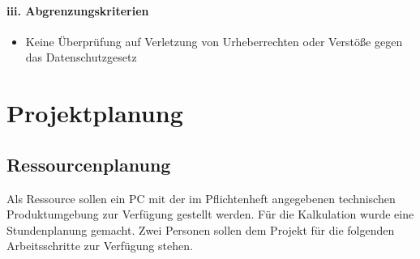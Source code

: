 \documentclass[10pt]{scrarticle}
\begin{document}
\paragraph{iii. Abgrenzungskriterien}

\begin{itemize}
\item Keine Überprüfung auf Verletzung von Urheberrechten oder Verstöße gegen das    Datenschutzgesetz
\end{itemize}


\section{Projektplanung}
\subsection{Ressourcenplanung}
Als Ressource sollen ein PC mit der im Pflichtenheft angegebenen technischen Produktumgebung zur Verfügung gestellt werden. Für die Kalkulation wurde eine Stundenplanung gemacht. Zwei Personen sollen dem Projekt für die folgenden Arbeitsschritte zur Verfügung stehen.
\end{document}
